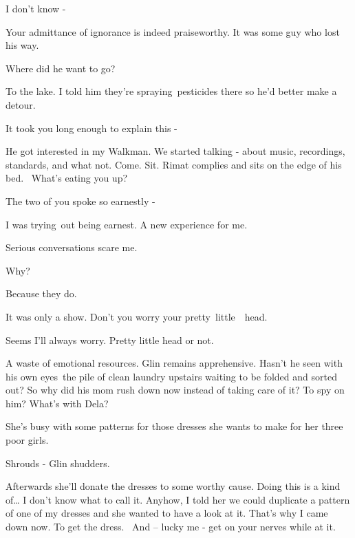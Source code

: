 \documentclass[letterpaper]{article}
\begin{document}
{\textquotedbl}I don't know -{\textquotedbl} 

{\textquotedbl}Your admittance of ignorance is indeed praiseworthy. It was some guy who lost his way.{\textquotedbl} 

{\textquotedbl}Where did he want to go?{\textquotedbl} 

{\textquotedbl}To the lake. I told him they're spraying~pesticides there so he'd better make a detour.{\textquotedbl} 

{\textquotedbl}It took you long enough to explain this -{\textquotedbl} 

{\textquotedbl}He got interested in my Walkman. We started talking - about music, recordings, standards, and what not.
Come. Sit.{\textquotedbl} Rimat complies and sits on the edge of his bed.~ {\textquotedbl}What's eating you
up?{\textquotedbl} 

{\textquotedbl}The two of you spoke so earnestly -{\textquotedbl} 

{\textquotedbl}I was trying~out being earnest. A new experience for me.{\textquotedbl}

{\textquotedbl}Serious conversations scare me.{\textquotedbl} 

{\textquotedbl}Why?{\textquotedbl} 

{\textquotedbl}Because they do.{\textquotedbl} 

{\textquotedbl}It was only a show. Don't you worry your pretty\ little\ \ head.{\textquotedbl}

{\textquotedbl}Seems I'll always worry. Pretty little head or not.{\textquotedbl} 

{\textquotedbl}A waste of emotional resources.{\textquotedbl} Glin remains apprehensive. Hasn't he seen with his own
eyes~the pile of clean laundry upstairs waiting to be folded and sorted out? So why did his mom rush down now instead
of taking care of it? To spy on him? {\textquotedbl}What's with Dela?{\textquotedbl}~ 

{\textquotedbl}She's busy with some patterns for those dresses she wants to make for her three poor
girls.{\textquotedbl} 

{\textquotedbl}Shrouds - {\textquotedbl} Glin shudders. 

{\textquotedbl}Afterwards she'll donate the dresses to some worthy cause. Doing this is a kind of{\dots} I don't know
what to call it. Anyhow, I told her we could duplicate a pattern of one of my dresses and she wanted to have a look at
it. That's why I came down now. To get the dress. ~And -- lucky me - get on your nerves while at it.{\textquotedbl} 
\end{document}
